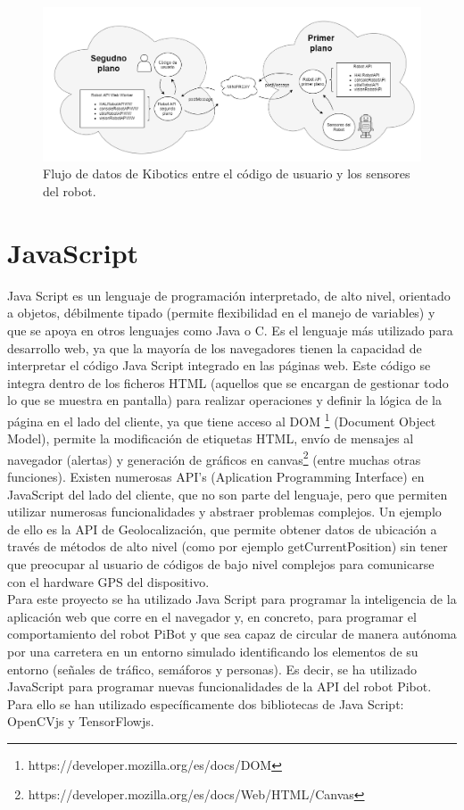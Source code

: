 \documentclass{report}
\begin{document}
\renewcommand{\figurename}{Figura}		
\begin{figure}[t]
	\centering
	 \includegraphics[scale=0.4]{images/kibotics.png}
	 \caption{Flujo de datos de Kibotics entre el código de usuario y los sensores del robot.}
\end{figure}

\newpage
\section{JavaScript}
Java Script es un lenguaje de programación interpretado,  de alto nivel, orientado a objetos, débilmente tipado (permite flexibilidad en el manejo de variables) y que se apoya en otros lenguajes como Java o C. Es el lenguaje más utilizado para desarrollo web, ya que la mayoría de los navegadores tienen la capacidad de interpretar el código Java Script integrado en las páginas web. Este código se integra dentro de los ficheros HTML (aquellos que se encargan de gestionar todo lo que se muestra en pantalla) para realizar operaciones y definir la lógica de la página en el lado del cliente, ya que tiene acceso al DOM \footnote{https://developer.mozilla.org/es/docs/DOM} (Document Object Model),  permite la modificación de etiquetas HTML, envío de mensajes al navegador (alertas) y generación de gráficos en canvas\footnote{https://developer.mozilla.org/es/docs/Web/HTML/Canvas} (entre  muchas otras funciones). Existen numerosas API's (Aplication Programming Interface) en JavaScript del lado del cliente, que no son parte del lenguaje, pero que permiten utilizar numerosas funcionalidades y abstraer problemas complejos. Un ejemplo de ello es la API de Geolocalización, que permite obtener datos de ubicación a través de métodos de alto nivel (como por ejemplo getCurrentPosition) sin tener que preocupar al usuario de códigos de bajo nivel complejos para comunicarse con el hardware GPS del dispositivo. 
\\

Para este proyecto se ha utilizado Java Script para programar la inteligencia de la aplicación web que corre en el navegador y, en concreto, para programar el comportamiento del robot PiBot y que sea capaz de circular de manera autónoma por una carretera en un entorno simulado identificando los elementos de su entorno (señales de tráfico, semáforos y personas). Es decir, se ha utilizado JavaScript para programar nuevas funcionalidades de la API del robot Pibot. Para ello se han utilizado específicamente dos bibliotecas de Java Script: OpenCVjs y TensorFlowjs.
\end{document}
